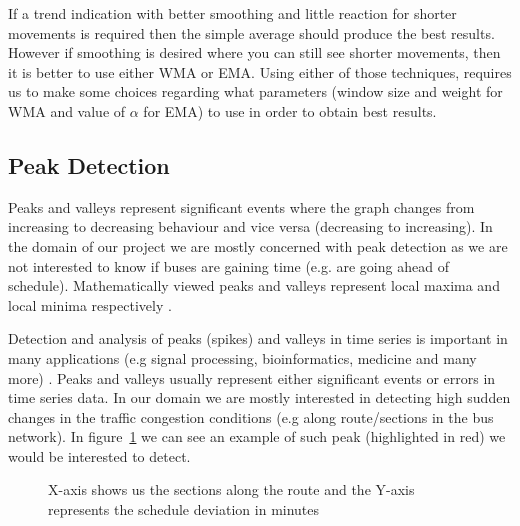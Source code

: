 If a trend indication with better smoothing and little reaction for shorter movements is required then the simple average should produce the best results. However if smoothing is desired where you can still see shorter movements, then it is better to use either WMA or EMA. Using either of those techniques, requires us to make some choices regarding what parameters (window size and weight for WMA and value of $\alpha$ for EMA) to use in order to obtain best results.


\subsection{Peak Detection}
Peaks and valleys represent significant events where the graph changes from increasing to decreasing behaviour and vice versa (decreasing to increasing). In the domain of our project we are mostly concerned with peak detection as we are not interested to know if buses are gaining time (e.g. are going ahead of schedule). Mathematically viewed peaks and valleys represent local maxima and local minima respectively \cite{simon1994mathematics}.

Detection and analysis of peaks (spikes) and valleys in time series is important in many applications (e.g signal processing, bioinformatics, medicine and many more) \cite{ventzas2011peak}. Peaks and valleys usually represent either significant events or errors in time series data. In our domain we are mostly interested in detecting high sudden changes in the traffic congestion conditions (e.g along route/sections in the bus network). In figure~\ref{fig:peakExampleGraph} we can see an example of such peak (highlighted in red) we would be interested to detect.

\begin{figure}[ht]
	\caption{X-axis shows us the sections along the route and the Y-axis represents the schedule deviation in minutes}
	\label{fig:peakExampleGraph}
\end{figure}

